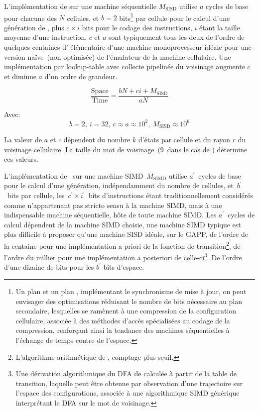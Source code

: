 L'implémentation de  sur une machine séquentielle
$M_{\text{SISD}}$ utilise $a$ cycles de base pour chacune des $N$
cellules, et $b = 2$ bits\footnote{%
  Un plan  et un plan , implémentant le
  synchronisme de mise à jour, on peut envisager des optimisations
  réduisant le nombre de bits nécessaire au plan secondaire,
  lesquelles se ramènent à une compression de la configuration
  cellulaire, associée à des méthodes d'accès spécialisées au codage de
  la compression, renforçant ainsi la tendance des machines
  séquentielles à l'échange de temps contre de l'espace.} %
par cellule pour le calcul d'une génération de , plus
$c \times  i$ bits pour le codage des instructions, $i$ étant la taille
moyenne d'une instruction. %
$c$ et $a$ sont typiquement tous les deux de l'ordre de quelques
centaines d' élémentaire d'une machine
monoprocesseur idéale pour une version naïve~(non optimisée) de
l'émulateur de la machine cellulaire. %
Une implémentation par lookup-table avec collecte pipelinée du
voisinage augmente $c$ et diminue $a$ d'un ordre de grandeur. %

\begin{equation}
  \frac{\text{Space}}{\text{Time}} = \frac{bN+ci+M_{\text{SISD}}}{aN}
  \label{eq-life-sisd}
\end{equation}

Avec:\[b = 2,~i = 32,~c \approx a \approx 10^2,~M_{\text{SISD}}
\approx 10^6\]

La valeur de $a$ et $c$ dépendent du nombre $k$ d'états par cellule et
du rayon $r$ du voisinage cellulaire. %
La taille du mot de voisinage~(9~dans le cas de )
détermine ces valeurs. %

L'implémentation de~ sur une machine
SIMD~$M_{\text{SIMD}}$ utilise $a^{\prime}$~cycles de base pour le
calcul d'une génération, indépendamment du nombre de cellules,
et~$b^{\prime}$~bits par cellule, les~$c^{\prime} \times  i^{\prime}$~bits
d'instructions étant traditionnellement considérés comme n'appartenant
pas stricto sensu à la machine SIMD, mais à une indispensable machine
séquentielle, hôte de toute machine SIMD\@. %
Les $a^{\prime}$~cycles de calcul dépendent de la machine SIMD choisie,
une machine SIMD typique est plus difficile à proposer qu'une
machine SISD idéale, sur le GAPP, de l'ordre de la centaine pour une
implémentation a priori de la fonction de transition\footnote{%
  L'algorithme arithmétique de , comptage plus seuil.}, %
de l'ordre du millier pour une implémentation a posteriori de celle-ci\footnote{%
  Une dérivation algorithmique du DFA de  calculée à partir
  de la table de transition, laquelle peut être obtenue par observation
  d'une trajectoire sur l'espace des configurations, associée à une
  algorithmique SIMD générique interprétant le DFA sur le mot de voisinage.}. %
De l'ordre d'une dizaine de bits pour les $b^{\prime}$ bits d'espace. %

